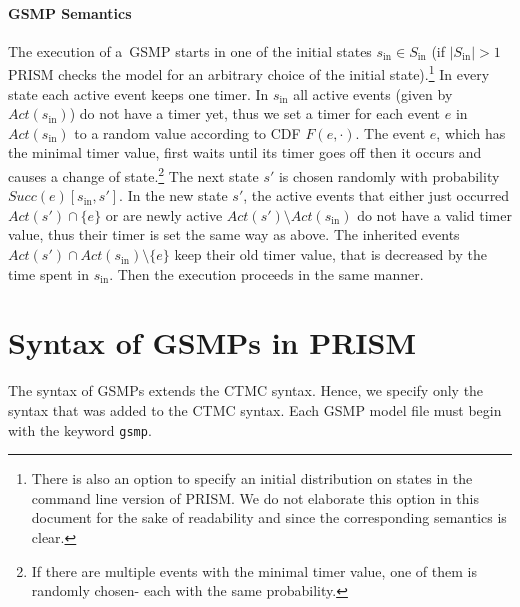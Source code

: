 \documentclass{article}
\renewcommand{\_}{\underline{~}}
\newcommand{\suc}{Succ}
\newcommand{\initstate}{s_\mathrm{in}}
\newcommand{\initstates}{S_\mathrm{in}}
\newcommand{\act}{Act}
\newcommand{\code}[1]{\texttt{#1}}
\begin{document}
\paragraph{GSMP Semantics}
The execution of a~GSMP starts in one of the initial states $\initstate \in \initstates$ (if $|\initstates|>1$ PRISM checks the model for an arbitrary choice of the initial state).\footnote{
  There is also an option to specify an initial distribution on states in the command line version of PRISM.
  We do not elaborate this option in this document for the sake of readability and since the corresponding semantics is clear.
} 
In every state each active event keeps one timer.
In $\initstate$ all active events (given by $\act(\initstate)$) do not have a timer yet, thus we set a timer for each event $e$ in $\act(\initstate)$ to a random value according to CDF $F(e,\cdot)$.
The event $e$, which has the minimal timer value, first waits until its timer goes off then it occurs and causes a change of state.\footnote{ If there are multiple events with the minimal timer value, one of them is randomly chosen- each with the same probability.}  
The next state $s'$ is chosen randomly with probability $\suc(e)[\initstate,s']$.
In the new state $s'$, the active events that either just occurred $\act(s') \cap \{e\}$ or are newly active $\act(s') \setminus \act(\initstate)$ do not have a valid timer value, thus their timer is set the same way as above.
The inherited events $\act(s') \cap \act(\initstate) \setminus \{e\}$ keep their old timer value, that is decreased by the time spent in $\initstate$. 
Then the execution proceeds in the same manner. 

\section*{Syntax of GSMPs in PRISM}
The syntax of GSMPs extends the CTMC syntax.
Hence, we specify only the syntax that was added to the CTMC syntax. 
Each GSMP model file must begin with the keyword \code{gsmp}. 
\end{document}
